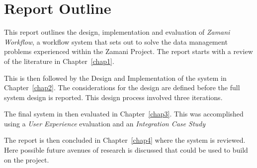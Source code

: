 \section{Report Outline}
    This report outlines the design, implementation and evaluation
    of \emph{Zamani Workflow}, a workflow system that sets out to
    solve the data management problems experienced within the
    Zamani Project. The report starts with a review of the literature in
    Chapter~\ref{chap1}.

    This is then followed by the Design and Implementation of the system
    in Chapter~\ref{chap2}. The considerations for the design are defined
    before the full system design is reported. This design process involved
    three iterations.  

    The final system in then evaluated in Chapter~\ref{chap3}. This was accomplished 
    using a \emph{User Experience} evaluation and an \emph{Integration Case Study}

    The report is then concluded in Chapter~\ref{chap4} where the system is 
    reviewed. Here possible future avenues of research is discussed that could
    be used to build on the project.
